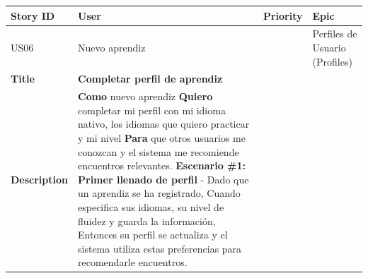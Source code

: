 {\def\LTcaptype{none} %
\begin{longtable}[]{@{}
  >{\raggedright\arraybackslash}p{}
  >{\raggedright\arraybackslash}p{}
  >{\raggedright\arraybackslash}p{}
  >{\raggedright\arraybackslash}p{}@{}}
\toprule\noalign{}
\begin{minipage}[b]{\linewidth}\raggedright
Story ID
\end{minipage} & \begin{minipage}[b]{\linewidth}\raggedright
User
\end{minipage} & \begin{minipage}[b]{\linewidth}\raggedright
Priority
\end{minipage} & \begin{minipage}[b]{\linewidth}\raggedright
Epic
\end{minipage} \\
\midrule\noalign{}
\endhead
\bottomrule\noalign{}
\endlastfoot
US06 & Nuevo aprendiz & 3 & Perfiles de Usuario (Profiles) \\
\textbf{Title} & \textbf{Completar perfil de aprendiz} & & \\
\textbf{Description} & \textbf{Como} nuevo aprendiz \textbf{Quiero}
completar mi perfil con mi idioma nativo, los idiomas que quiero
practicar y mi nivel \textbf{Para} que otros usuarios me conozcan y el
sistema me recomiende encuentros relevantes. \textbf{Escenario \#1:
Primer llenado de perfil} - Dado que un aprendiz se ha registrado,
Cuando especifica sus idiomas, su nivel de fluidez y guarda la
información, Entonces su perfil se actualiza y el sistema utiliza estas
preferencias para recomendarle encuentros. & & \\
\end{longtable}
}

